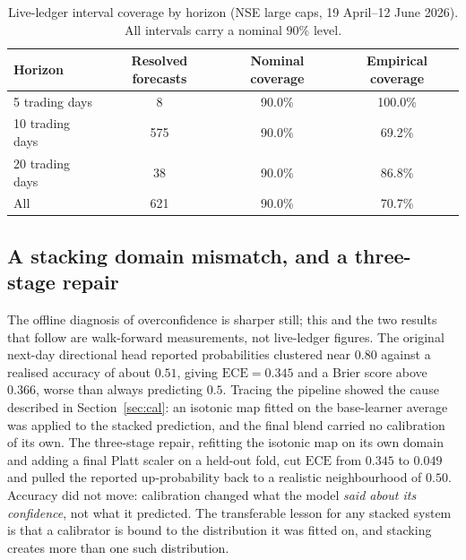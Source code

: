 \documentclass{elektr}
\begin{document}
\begin{table}[h!]
\caption{Live-ledger interval coverage by horizon (NSE large caps, 19 April--12 June 2026). All intervals carry a nominal $90\%$ level.}
\begin{center}
\begin{tabular}{lccc}
\toprule
Horizon & Resolved forecasts & Nominal coverage & Empirical coverage \\
\midrule
5 trading days  & 8   & 90.0\% & 100.0\% \\
10 trading days & 575 & 90.0\% & 69.2\% \\
20 trading days & 38  & 90.0\% & 86.8\% \\
\midrule
All             & 621 & 90.0\% & 70.7\% \\
\bottomrule
\end{tabular}
\label{tab:cov}
\end{center}\vs{-6mm}
\end{table}

\subsection{A stacking domain mismatch, and a three-stage repair}
\label{sec:resultcal}
The offline diagnosis of overconfidence is sharper still; this and the two results that follow are walk-forward measurements, not live-ledger figures. The original next-day directional head reported probabilities clustered near $0.80$ against a realised accuracy of about $0.51$, giving $\mathrm{ECE}=0.345$ and a Brier score above $0.366$, worse than always predicting $0.5$. Tracing the pipeline showed the cause described in Section~\ref{sec:cal}: an isotonic map fitted on the base-learner average was applied to the stacked prediction, and the final blend carried no calibration of its own. The three-stage repair, refitting the isotonic map on its own domain and adding a final Platt scaler on a held-out fold, cut $\mathrm{ECE}$ from $0.345$ to $0.049$ and pulled the reported up-probability back to a realistic neighbourhood of $0.50$. Accuracy did not move: calibration changed what the model \emph{said about its confidence}, not what it predicted. The transferable lesson for any stacked system is that a calibrator is bound to the distribution it was fitted on, and stacking creates more than one such distribution.
\end{document}
